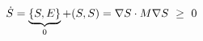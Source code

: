 \documentclass[preview]{standalone}
\begin{document}
\begin{align*}
\special{dvisvgm:raw <g id='unique000'>}\dot S=\underbrace{\{S,E\}}_{0}+(S,S)=\nabla S\cdot M\nabla S\ \ge\ 0\special{dvisvgm:raw </g>}
\end{align*}
\end{document}
